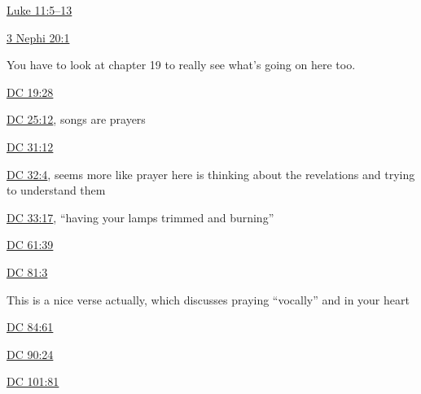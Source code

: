 		\begin{compactitem}
			\item \hyperref[LUKE-11-5]{Luke 11:5--13}
			\item \hyperref[3NEPHI-20-1]{3 Nephi 20:1} 
				\begin{compactitem}
					\item You have to look at chapter 19 to really see what's going on here too.
				\end{compactitem}
			\item \hyperref[DC19-28]{DC 19:28}
			\item \hyperref[DC25-12]{DC 25:12}, songs are prayers
			\item \hyperref[DC31-12]{DC 31:12}
			\item \hyperref[DC32-4]{DC 32:4}, seems more like prayer here is thinking about the revelations and trying to understand them
			\item \hyperref[DC33-17]{DC 33:17}, ``having your lamps trimmed and burning''
			\item \hyperref[DC61-39]{DC 61:39}
			\item \hyperref[DC81-3]{DC 81:3}
				\begin{compactitem}
					\item This is a nice verse actually, which discusses praying ``vocally'' and in your heart
				\end{compactitem}
			\item \hyperref[DC84-61]{DC 84:61}
			\item \hyperref[DC90-24]{DC 90:24}
			\item \hyperref[DC101-81]{DC 101:81}
		\end{compactitem}